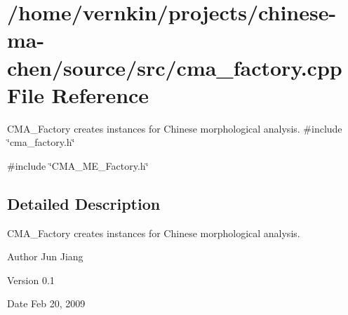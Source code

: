 \section{/home/vernkin/projects/chinese-\/ma-\/chen/source/src/cma\_\-factory.cpp File Reference}
\label{cma__factory_8cpp}


CMA\_\-Factory creates instances for Chinese morphological analysis.  
{\ttfamily \#include \char`\"{}cma\_\-factory.h\char`\"{}}\par
{\ttfamily \#include \char`\"{}CMA\_\-ME\_\-Factory.h\char`\"{}}\par


\subsection{Detailed Description}
CMA\_\-Factory creates instances for Chinese morphological analysis. \begin{DoxyAuthor}{Author}
Jun Jiang 
\end{DoxyAuthor}
\begin{DoxyVersion}{Version}
0.1 
\end{DoxyVersion}
\begin{DoxyDate}{Date}
Feb 20, 2009 
\end{DoxyDate}
